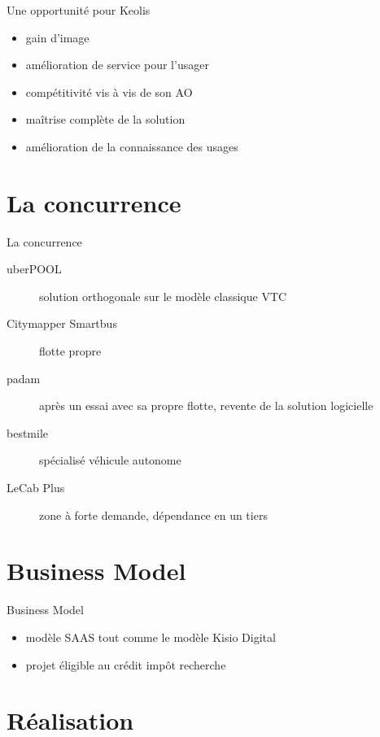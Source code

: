 \documentclass[table]{beamer}
\begin{document}
\begin{frame}{Une opportunité pour Keolis}

  \begin{itemize}
  \item gain d'image
  \item amélioration de service pour l'usager
  \item compétitivité vis à vis de son AO
  \item maîtrise complète de la solution
  \item amélioration de la connaissance des usages
  \end{itemize}
\end{frame}

\section{La concurrence}

\begin{frame}{La concurrence}

  \begin{description}
  \item[uberPOOL] solution orthogonale sur le
    modèle classique VTC
  \item[Citymapper Smartbus] flotte propre
  \item[padam] après un essai avec sa propre flotte, revente de la
    solution logicielle
  \item[bestmile] spécialisé véhicule autonome
  \item[LeCab Plus] zone à forte demande, dépendance en un tiers
  \end{description}
\end{frame}

\section{Business Model}

\begin{frame}{Business Model}
  \begin{itemize}
  \item modèle SAAS tout comme le modèle Kisio Digital
  \item projet éligible au crédit impôt recherche
  \end{itemize}
\end{frame}

\section{Réalisation}
\end{document}
